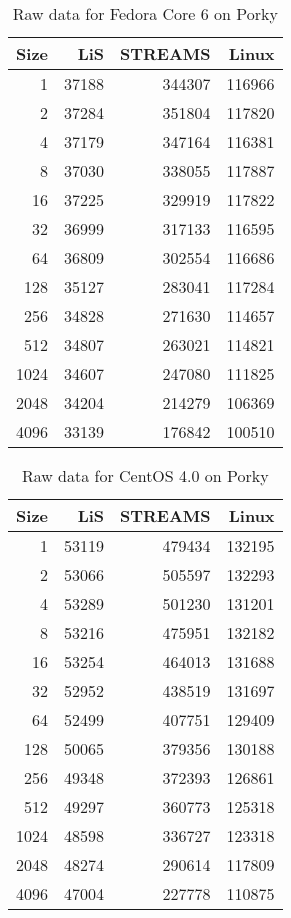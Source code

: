 \documentclass[letterpaper,final,notitlepage,twocolumn,10pt,twoside]{article}
\begin{document}
\begin{appendix}
\begin{table}[h]
\footnotesize
\setlength{\tabcolsep}{0.3em}
\setlength{\arraycolsep}{0.3em}
\begin{center}
\begin{tabular}{rrrr}\\
\hline
Size & LiS & STREAMS & Linux\\
\hline
\hline
1 & 37188 & 344307 & 116966\\
2 & 37284 & 351804 & 117820\\
4 & 37179 & 347164 & 116381\\
8 & 37030 & 338055 & 117887\\
16 & 37225 & 329919 & 117822\\
32 & 36999 & 317133 & 116595\\
64 & 36809 & 302554 & 116686\\
128 & 35127 & 283041 & 117284\\
256 & 34828 & 271630 & 114657\\
512 & 34807 & 263021 & 114821\\
1024 & 34607 & 247080 & 111825\\
2048 & 34204 & 214279 & 106369\\
4096 & 33139 & 176842 & 100510\\
\hline
\end{tabular}
\end{center}
\caption{Raw data for Fedora Core 6 on Porky}
\label{table:fc6data}
\normalsize
\end{table}

\begin{table}[h]
\footnotesize
\setlength{\tabcolsep}{0.3em}
\setlength{\arraycolsep}{0.3em}
\begin{center}
\begin{tabular}{rrrr}\\
\hline
Size & LiS & STREAMS & Linux\\
\hline
\hline
1 & 53119 & 479434 & 132195\\
2 & 53066 & 505597 & 132293\\
4 & 53289 & 501230 & 131201\\
8 & 53216 & 475951 & 132182\\
16 & 53254 & 464013 & 131688\\
32 & 52952 & 438519 & 131697\\
64 & 52499 & 407751 & 129409\\
128 & 50065 & 379356 & 130188\\
256 & 49348 & 372393 & 126861\\
512 & 49297 & 360773 & 125318\\
1024 & 48598 & 336727 & 123318\\
2048 & 48274 & 290614 & 117809\\
4096 & 47004 & 227778 & 110875\\
\hline
\end{tabular}
\end{center}
\caption{Raw data for CentOS 4.0 on Porky}
\label{table:centosdata}
\normalsize
\end{table}


\end{appendix}
\end{document}
